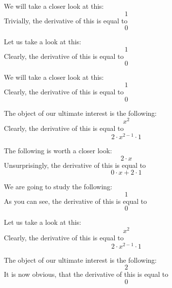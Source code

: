 \documentclass{article}
\begin{document}
We will take a closer look at this:
\begin{equation}
1 
\end{equation}
Trivially, the derivative of this is equal to
\begin{equation}
0 
\end{equation}

Let us take a look at this:
\begin{equation}
1 
\end{equation}
Clearly, the derivative of this is equal to
\begin{equation}
0 
\end{equation}

We will take a closer look at this:
\begin{equation}
1 
\end{equation}
Clearly, the derivative of this is equal to
\begin{equation}
0 
\end{equation}

The object of our ultimate interest is the following:
\begin{equation}
x ^{2 } 
\end{equation}
Clearly, the derivative of this is equal to
\begin{equation}
2 \cdot x ^{2 - 1 } \cdot 1 
\end{equation}

The following is worth a closer look:
\begin{equation}
2 \cdot x 
\end{equation}
Unsurprisingly, the derivative of this is equal to
\begin{equation}
0 \cdot x + 2 \cdot 1 
\end{equation}

We are going to study the following:
\begin{equation}
1 
\end{equation}
As you can see, the derivative of this is equal to
\begin{equation}
0 
\end{equation}

Let us take a look at this:
\begin{equation}
x ^{2 } 
\end{equation}
Clearly, the derivative of this is equal to
\begin{equation}
2 \cdot x ^{2 - 1 } \cdot 1 
\end{equation}

The object of our ultimate interest is the following:
\begin{equation}
2 
\end{equation}
It is now obvious, that the derivative of this is equal to
\begin{equation}
0 
\end{equation}
\end{document}

